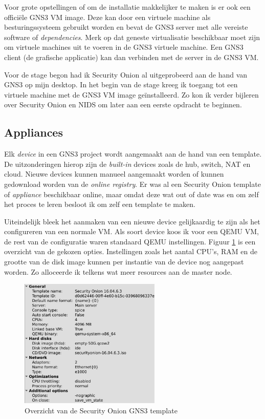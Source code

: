 \documentclass[a4paper,12pt]{report}
\begin{document}
Voor grote opstellingen of om de installatie makkelijker te maken is er ook een officiële GNS3 VM image.
Deze kan door een virtuele machine als besturingssysteem gebruikt worden en bevat de GNS3 server met alle vereiste software of \emph{dependencies}.
Merk op dat geneste virtualisatie beschikbaar moet zijn om virtuele machines uit te voeren in de GNS3 virtuele machine.
Een GNS3 client (de grafische applicatie) kan dan verbinden met de server in de GNS3 VM.

Voor de stage begon had ik Security Onion al uitgeprobeerd aan de hand van GNS3 op mijn desktop.
In het begin van de stage kreeg ik toegang tot een virtuele machine met de GNS3 VM image geïnstalleerd.
Zo kon ik verder bijleren over Security Onion en NIDS om later aan een eerste opdracht te beginnen.

\subsection{Appliances}
Elk \emph{device} in een GNS3 project wordt aangemaakt aan de hand van een template.
De uitzonderingen hierop zijn de \emph{built-in} devices zoals de hub, switch, NAT en cloud.
Nieuwe devices kunnen manueel aangemaakt worden of kunnen gedownload worden van de \emph{online registry}.
Er was al een Security Onion template of \emph{appliance} beschikbaar online, maar omdat deze wat out of date was en om zelf het proces te leren besloot ik om zelf een template te maken.

Uiteindelijk bleek het aanmaken van een nieuwe device gelijkaardig te zijn als het configureren van een normale VM.
Als soort device koos ik voor een QEMU VM, de rest van de configuratie waren standaard QEMU instellingen.
Figuur \ref{fig:gns3-so-appliance} is een overzicht van de gekozen opties.
Instellingen zoals het aantal CPU's, RAM en de grootte van de disk image kunnen per instantie van de device nog aangepast worden.
Zo alloceerde ik telkens wat meer resources aan de master node.

\begin{figure}[H]
  \centering
  \includegraphics[width=0.6\textwidth]{gns3-so-appliance}
  \caption{Overzicht van de Security Onion GNS3 template}
  \label{fig:gns3-so-appliance}
\end{figure}
\end{document}
